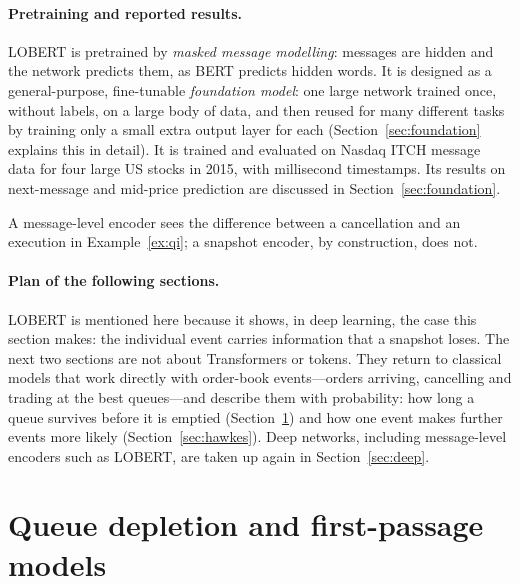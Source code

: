 \paragraph{Pretraining and reported results.} LOBERT is pretrained by \emph{masked message modelling}: messages are hidden
and the network predicts them, as BERT predicts hidden words. It is designed as a general-purpose,
fine-tunable \emph{foundation model}: one large network trained once, without labels, on a large body of data,
and then reused for many different tasks by training only a small extra output layer for each (Section~\ref{sec:foundation}
explains this in detail). It is trained and evaluated on Nasdaq ITCH message data for four large US
stocks in 2015, with millisecond timestamps. Its results on next-message and mid-price prediction are
discussed in Section~\ref{sec:foundation}.

A message-level encoder sees the difference between a cancellation and an execution in
Example~\ref{ex:qi}; a snapshot encoder, by construction, does not.

\paragraph{Plan of the following sections.} LOBERT is mentioned here because it shows, in deep learning, the
case this section makes: the individual event carries information that a snapshot loses. The next two
sections are not about Transformers or tokens. They return to classical models that work directly with
order-book events---orders arriving, cancelling and trading at the best queues---and describe them with
probability: how long a queue survives before it is emptied (Section~\ref{sec:queue-models}) and how one
event makes further events more likely (Section~\ref{sec:hawkes}). Deep networks, including message-level
encoders such as LOBERT, are taken up again in Section~\ref{sec:deep}.

\section{Queue depletion and first-passage models}
\label{sec:queue-models}

